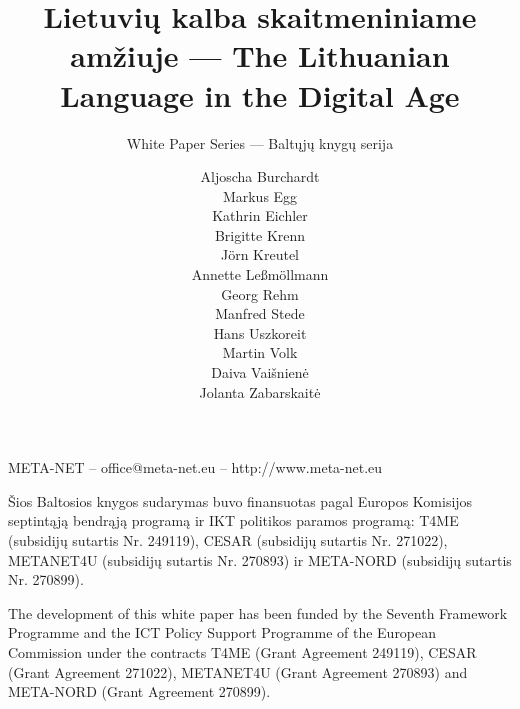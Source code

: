 \documentclass[]{../metanetpaper}
\title{Lietuvių kalba skaitmeniniame amžiuje --- The Lithuanian Language in the Digital Age}
\subtitle{White Paper Series --- Baltųjų knygų serija}
\author{
  Aljoscha Burchardt \\
  Markus Egg \\
  Kathrin Eichler \\
  Brigitte Krenn \\
  Jörn Kreutel \\
  Annette Leßmöllmann \\
  Georg Rehm \\
  Manfred Stede \\
  Hans Uszkoreit \\
  Martin Volk \\
  Daiva Vaišnienė \\
  Jolanta Zabarskaitė
}
\begin{document}
\renewcommand*{\figureformat}{\sffamily\thefigure\autodot}

\maketitle

\null
\pagestyle{empty} 

\centerline{META-NET -- office@meta-net.eu -- http://www.meta-net.eu}

\vfill

\begin{small}
  Šios Baltosios knygos sudarymas buvo finansuotas pagal Europos Komisijos septintąją bendrąją programą ir IKT politikos paramos programą: T4ME (subsidijų sutartis Nr. 249119), CESAR (subsidijų sutartis Nr. 271022), METANET4U (subsidijų sutartis Nr. 270893) ir META-NORD (subsidijų sutartis Nr. 270899).
\end{small}

\bigskip
\begin{small}
  The development of this white paper has been funded by the Seventh
  Framework Programme and the ICT Policy Support Programme of the
  European Commission under the contracts T4ME (Grant Agreement 249119),
  CESAR (Grant Agreement 271022), METANET4U (Grant Agreement 270893)
  and META-NORD (Grant Agreement 270899).
\end{small}

\clearpage

\setcounter{page}{5}
\pagestyle{scrheadings}

\cleardoublepage


\end{document}
